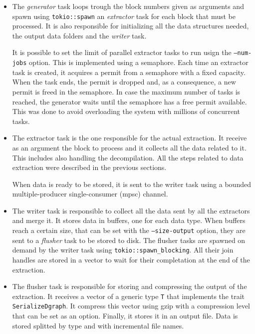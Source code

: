 \begin{itemize}
    \item The \textit{generator} task loops trough the block numbers given as arguments and spawn using \texttt{tokio::spawn} an \textit{extractor} task for each block that must be processed. It is also responsible for initializing all the data structures needed, the output data folders and the \textit{writer} task. 
    
    It is possible to set the limit of parallel extractor tasks to run usign the \texttt{--num-jobs} option. This is implemented using a semaphore. Each time an extractor task is created, it acquires a permit from a semaphore with a fixed capacity. When the task ends, the permit is dropped and, as a consequence, a new permit is freed in the semaphore. In case the maximum number of tasks is reached, the generator waits until the semaphore has a free permit available. This was done to avoid overloading the system with millions of concurrent tasks.

    \item The extractor task is the one responsible for the actual extraction. It receive as an argument the block to process and it collects all the data related to it. This includes also handling the decompilation. All the steps related to data extraction were described in the previous sections.

    When data is ready to be stored, it is sent to the writer task using a bounded multiple-producer single-consumer (mpsc) channel.

    \item The writer task is responsible to collect all the data sent by all the extractors and merge it. It stores data in buffers, one for each data type. When buffers reach a certain size, that can be set with the \texttt{--size-output} option, they are sent to a \textit{flusher} task to be stored to disk. The flusher tasks are spawned on demand by the writer task using \texttt{tokio::spawn\_blocking}. All their join handles are stored in a vector to wait for their completation at the end of the extraction.

    \item The flusher task is responsible for storing and compressing the output of the extraction. It receives a vector of a generic type \texttt{T} that implements the trait \texttt{SerializeDgraph}. It compress this vector using gzip with a compression level that can be set as an option. Finally, it stores it in an output file. Data is stored splitted by type and with incremental file names.
\end{itemize}

